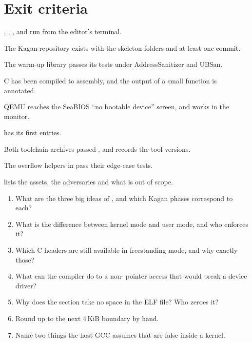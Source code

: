 \documentclass[11pt,a4paper]{article}
\begin{document}
\section{Exit criteria}

\begin{milestonebox}
\begin{checklist}
  \item {}, , ,  and  run from the editor's terminal.
  \item The Kagan repository exists with the skeleton folders and at least one commit.
  \item The warm-up library passes its tests under AddressSanitizer and UBSan.
  \item C has been compiled to assembly, and the output of a small function is annotated.
  \item QEMU reaches the SeaBIOS ``no bootable device'' screen, and  works in the monitor.
  \item {} has its first entries.
  \item Both toolchain archives passed , and  records the tool versions.
  \item The overflow helpers in  pass their edge-case tests.
  \item {} lists the assets, the adversaries and what is out of scope.
\end{checklist}
\end{milestonebox}

\begin{questionbox}
\begin{enumerate}
  \item What are the three big ideas of \OSTEP, and which Kagan phases correspond to each?
  \item What is the difference between kernel mode and user mode, and who enforces it?
  \item Which C headers are still available in freestanding mode, and why exactly those?
  \item What can the compiler do to a non- pointer access that would break a device driver?
  \item Why does the  section take no space in the ELF file? Who zeroes it?
  \item Round  up to the next 4\,KiB boundary by hand.
  \item Name two things the host GCC assumes that are false inside a kernel.
\end{enumerate}
\end{questionbox}
\end{document}
